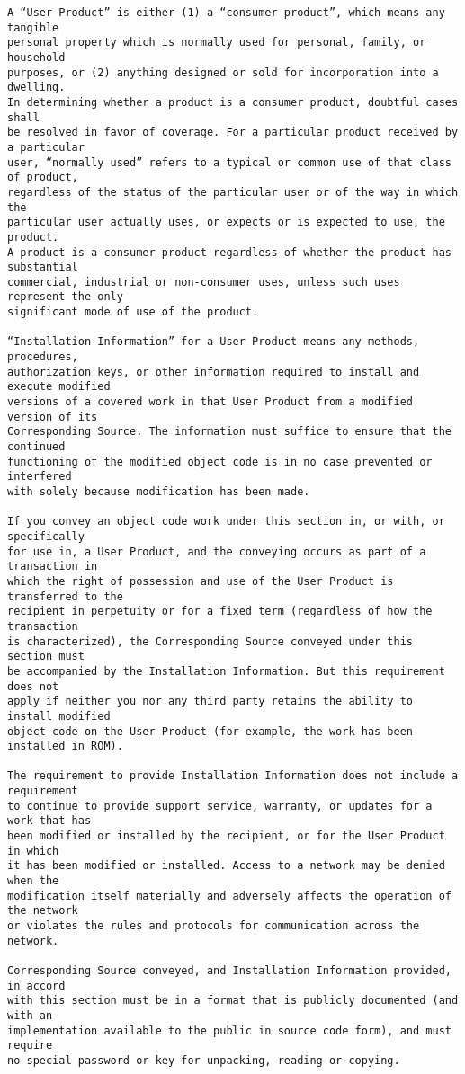 \begin{verbatim}
A “User Product” is either (1) a “consumer product”, which means any tangible
personal property which is normally used for personal, family, or household
purposes, or (2) anything designed or sold for incorporation into a dwelling.
In determining whether a product is a consumer product, doubtful cases shall
be resolved in favor of coverage. For a particular product received by a particular
user, “normally used” refers to a typical or common use of that class of product,
regardless of the status of the particular user or of the way in which the
particular user actually uses, or expects or is expected to use, the product.
A product is a consumer product regardless of whether the product has substantial
commercial, industrial or non-consumer uses, unless such uses represent the only
significant mode of use of the product.

“Installation Information” for a User Product means any methods, procedures,
authorization keys, or other information required to install and execute modified
versions of a covered work in that User Product from a modified version of its
Corresponding Source. The information must suffice to ensure that the continued
functioning of the modified object code is in no case prevented or interfered
with solely because modification has been made.

If you convey an object code work under this section in, or with, or specifically
for use in, a User Product, and the conveying occurs as part of a transaction in
which the right of possession and use of the User Product is transferred to the
recipient in perpetuity or for a fixed term (regardless of how the transaction
is characterized), the Corresponding Source conveyed under this section must
be accompanied by the Installation Information. But this requirement does not
apply if neither you nor any third party retains the ability to install modified
object code on the User Product (for example, the work has been installed in ROM).

The requirement to provide Installation Information does not include a requirement
to continue to provide support service, warranty, or updates for a work that has
been modified or installed by the recipient, or for the User Product in which
it has been modified or installed. Access to a network may be denied when the
modification itself materially and adversely affects the operation of the network
or violates the rules and protocols for communication across the network.

Corresponding Source conveyed, and Installation Information provided, in accord
with this section must be in a format that is publicly documented (and with an
implementation available to the public in source code form), and must require
no special password or key for unpacking, reading or copying.


\end{verbatim}
